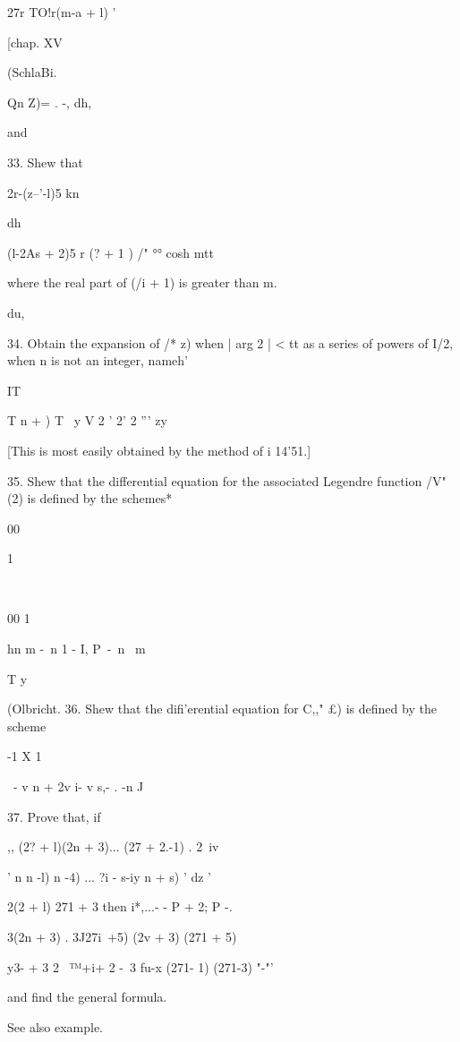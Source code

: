 {{{{27r TO!r(m-a + l) '

[chap. XV

(SchlaBi.

Qn Z)= . -, dh,

and

33. Shew that


 2r-(z--'-l)5 kn

dh

(l-2As + 2)5 r (? + 1 ) /" °° cosh mtt

where the real part of (/i + 1) is greater than m.

du,


34. Obtain the expansion of /* z) when | arg 2 | < tt as a series of
powers of I/2, when n is not an integer, nameh'

IT

T n + ) T \ y V 2 ' 2' 2 ''' zy

[This is most easily obtained by the method of i 14'51.]

35. Shew that the differential equation for the associated Legendre
function /V" (2) is defined by the schemes*

00

1

\

00 1

hn m -\ n 1 - I, P\ -\ n \ m ~

T y

(Olbricht. 36. Shew that the difi'erential equation for C,," £) is
defined by the scheme

 -1 X 1 \

\ - v n + 2v i- v s,- . -n J

37. Prove that, if

,, (2? + l)(2n + 3)... (27 + 2.-1) . 2\ iv

 ' n n -l) n -4) ... ?i - s-iy n + s) ' dz '

2(2 + l) 271 + 3 then i*,...- - P + 2; P -.

3(2n + 3) . 3J27i\ +5) (2v + 3) (271 + 5)

y3- + 3 2 \ ™+i+ 2 -\ 3 fu-x (271- 1) (271-3) "-"'

and find the general formula.


See also example.

%
%

}}}}
